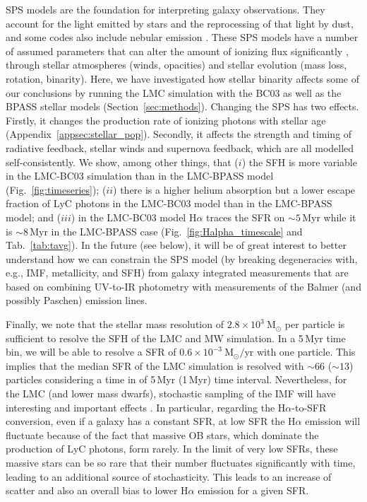 \documentclass[fleqn,usenatbib]{mnras}
\begin{document}
SPS models are the foundation for interpreting galaxy observations. They account for the light emitted by stars and the reprocessing of that light by dust, and some codes also include nebular emission \citep[see reviews by][]{walcher11, conroy13_rev}. These SPS models have a number of assumed parameters that can alter the amount of ionizing flux significantly \citep[e.g.,][]{eldridge12, levesque12, stanway16}, through stellar atmospheres (winds, opacities) and stellar evolution (mass loss, rotation, binarity). Here, we have investigated how stellar binarity affects some of our conclusions by running the LMC simulation with the BC03 as well as the BPASS stellar models (Section~\ref{sec:methods}). Changing the SPS has two effects. Firstly, it changes the production rate of ionizing photons with stellar age (Appendix~\ref{appsec:stellar_pop}). Secondly, it affects the strength and timing of radiative feedback, stellar winds and supernova feedback, which are all modelled self-consistently. We show, among other things, that ($i$) the SFH is more variable in the LMC-BC03 simulation than in the LMC-BPASS model (Fig.~\ref{fig:timeseries}); ($ii$) there is a higher helium absorption but a lower escape fraction of LyC photons  in the LMC-BC03 model than in the LMC-BPASS model; and ($iii$) in the LMC-BC03 model H$\alpha$ traces the SFR on $\sim5$\,Myr while it is $\sim8$\,Myr in the LMC-BPASS case (Fig.~\ref{fig:Halpha_timescale} and Tab.~\ref{tab:tavg}). In the future (see below), it will be of great interest to better understand how we can constrain the SPS model (by breaking degeneracies with, e.g., IMF, metallicity, and SFH) from galaxy integrated measurements that are based on combining UV-to-IR photometry with measurements of the Balmer (and possibly Paschen) emission lines. 

Finally, we note that the stellar mass resolution of $2.8\times10^3~\text{M}_{\odot}$ per particle is sufficient to resolve the SFH of the LMC and MW simulation. In a 5\,Myr time bin, we will be able to resolve a SFR of $0.6\times10^{-3}~\mathrm{M}_{\odot}/\mathrm{yr}$ with one particle. This implies that the median SFR of the LMC simulation is resolved with $\sim66$ ($\sim13$) particles considering a time in of 5\,Myr (1\,Myr) time interval. Nevertheless, for the LMC (and lower mass dwarfs), stochastic sampling of the IMF will have interesting and important effects \citep[e.g.,][]{fumagalli11, da-silva14}. In particular, regarding the H$\alpha$-to-SFR conversion, even if a galaxy has a constant SFR, at low SFR the H$\alpha$ emission will fluctuate because of the fact that massive OB stars, which dominate the production of LyC photons, form rarely. In the limit of very low SFRs, these massive stars can be so rare that their number fluctuates significantly with time, leading to an additional source of stochasticity. This leads to an increase of scatter and also an overall bias to lower H$\alpha$ emission for a given SFR. 
\end{document}
